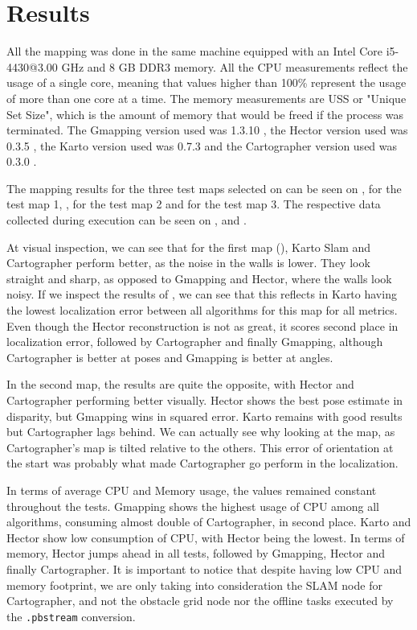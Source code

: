 \chapter{Results}\label{chp:results}

All the mapping was done in the same machine equipped with an Intel Core i5-4430@3.00 GHz and 8 GB DDR3 memory. All the CPU measurements reflect the usage of a single core, meaning that values higher than 100\% represent the usage of more than one core at a time. The memory measurements are USS or "Unique Set Size", which is the amount of memory that would be freed if the process was terminated. The Gmapping version used was 1.3.10 \cite{gmappinggit}, the Hector version used was 0.3.5 \cite{hectorgit}, the Karto version used was 0.7.3 \cite{kartogit} and the Cartographer version used was 0.3.0 \cite{cartographergit}.

The mapping results for the three test maps selected on  can be seen on , for the test map 1, , for the test map 2 and  for the test map 3. The respective data collected during execution can be seen on ,  and .

At visual inspection, we can see that for the first map (), Karto Slam and Cartographer perform better, as the noise in the walls is lower. They look straight and sharp, as opposed to Gmapping and Hector, where the walls look noisy. If we inspect the results of , we can see that this reflects in Karto having the lowest localization error between all algorithms for this map for all metrics. Even though the Hector reconstruction is not as great, it scores second place in localization error, followed by Cartographer and finally Gmapping, although Cartographer is better at poses and Gmapping is better at angles.

In the second map, the results are quite the opposite, with Hector and Cartographer performing better visually. Hector shows the best pose estimate in disparity, but Gmapping wins in squared error. Karto remains with good results but Cartographer lags behind. We can actually see why looking at the map, as Cartographer's map is tilted relative to the others. This error of orientation at the start was probably what made Cartographer go perform in the localization.

In terms of average CPU and Memory usage, the values remained constant throughout the tests. Gmapping shows the highest usage of CPU among all algorithms, consuming almost double of Cartographer, in second place. Karto and Hector show low consumption of CPU, with Hector being the lowest. In terms of memory, Hector jumps ahead in all tests, followed by Gmapping, Hector and finally Cartographer. It is important to notice that despite having low CPU and memory footprint, we are only taking into consideration the SLAM node for Cartographer, and not the obstacle grid node nor the offline tasks executed by the \texttt{.pbstream} conversion.

